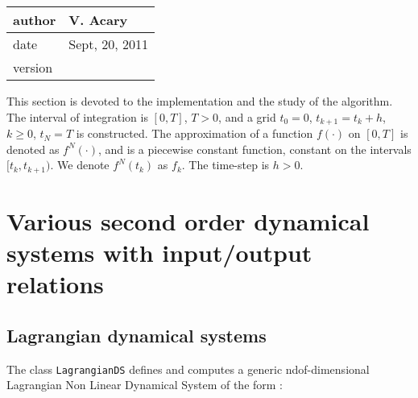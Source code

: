  \begin{table}[!ht]
  \begin{tabular}{|l|l|}
    \hline
    author  & V. Acary\\
    \hline
    date    & Sept, 20, 2011 \\ 
    \hline
    version &  \\
    \hline
  \end{tabular}
\end{table}



This section is devoted to the implementation and the study  of the algorithm. The interval of integration is $[0,T]$, $T>0$, and a grid $t_{0}=0$, $t_{k+1}=t_{k}+h$, $k \geq 0$, $t_{N}=T$ is constructed. The approximation of a function $f(\cdot)$ on $[0,T]$ is denoted as $f^{N}(\cdot)$, and is a piecewise constant function, constant on the intervals $[t_{k},t_{k+1})$. We denote $f^{N}(t_{k})$ as $f_{k}$. The time-step is $h>0$. 


\section{Various second  order dynamical systems with input/output relations}



\subsection{Lagrangian dynamical systems}


The class {\tt LagrangianDS}  defines  and computes a generic ndof-dimensional 
Lagrangian Non Linear Dynamical System of the form :

